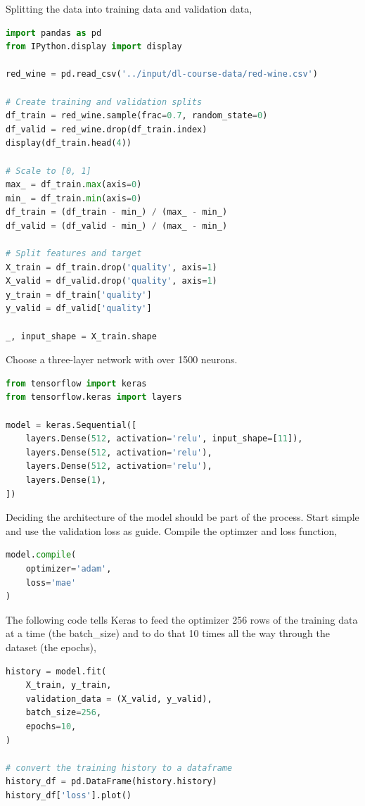 \noindent Splitting the data into training data and validation data,
\begin{lstlisting}[language=Python]
import pandas as pd
from IPython.display import display

red_wine = pd.read_csv('../input/dl-course-data/red-wine.csv')

# Create training and validation splits
df_train = red_wine.sample(frac=0.7, random_state=0)
df_valid = red_wine.drop(df_train.index)
display(df_train.head(4))

# Scale to [0, 1]
max_ = df_train.max(axis=0)
min_ = df_train.min(axis=0)
df_train = (df_train - min_) / (max_ - min_)
df_valid = (df_valid - min_) / (max_ - min_)

# Split features and target
X_train = df_train.drop('quality', axis=1)
X_valid = df_valid.drop('quality', axis=1)
y_train = df_train['quality']
y_valid = df_valid['quality']

_, input_shape = X_train.shape
\end{lstlisting}

\noindent Choose a three-layer network with over 1500 neurons. 

\begin{lstlisting}[language=Python]
from tensorflow import keras
from tensorflow.keras import layers

model = keras.Sequential([
    layers.Dense(512, activation='relu', input_shape=[11]),
    layers.Dense(512, activation='relu'),
    layers.Dense(512, activation='relu'),
    layers.Dense(1),
])
\end{lstlisting}

\noindent Deciding the architecture of the model should be part of the process.
Start simple and use the validation loss as guide. Compile the optimzer and loss
function,

\begin{lstlisting}[language=Python]
model.compile(
	optimizer='adam',
	loss='mae'
)
\end{lstlisting}

\noindent The following code tells Keras to feed the optimizer 256 rows of the training
data at a time (the batch\_size) and to do that 10 times all the way through the
dataset (the epochs),

\begin{lstlisting}[language=Python]
history = model.fit(
	X_train, y_train,
	validation_data = (X_valid, y_valid),
	batch_size=256,
	epochs=10,
)

# convert the training history to a dataframe
history_df = pd.DataFrame(history.history)
history_df['loss'].plot()
\end{lstlisting}

